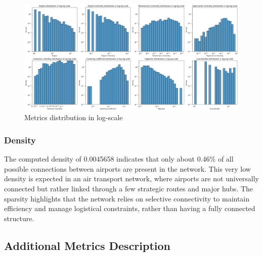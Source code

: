 \documentclass[12pt]{article}
\begin{document}
    \begin{figure}[H]
        \centering
        \includegraphics[width=0.8\linewidth]{img/metrics_logscale_output}
        \caption{Metrics distribution in log-scale}
    \end{figure}

    \subsubsection{Density}
    The computed density of 0.0045658 indicates that only about 0.46\% of all possible connections between airports are present in the network. This very low density is expected in an air transport network, where airports are not universally connected but rather linked through a few strategic routes and major hubs. The sparsity highlights that the network relies on selective connectivity to maintain efficiency and manage logistical constraints, rather than having a fully connected structure.

    \subsection{Additional Metrics Description}\label{subsec:additional-metrics-description}
\end{document}
